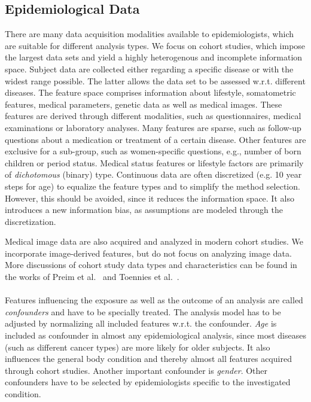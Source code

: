 \documentclass[journal]{style/vgtc} 			          %
\begin{document}
\subsection{Epidemiological Data} \label{sec:EpidemiologicalData}
There are many data acquisition modalities available to epidemiologists, which are suitable for different analysis types.
We focus on cohort studies, which impose the largest data sets and yield a highly heterogenous and incomplete information space.
Subject data are collected either regarding a specific disease or with the widest range possible.
The latter allows the data set to be assessed w.r.t. different diseases.
The feature space comprises information about lifestyle, somatometric features, medical parameters, genetic data as well as medical images.
These features are derived through different modalities, such as questionnaires, medical examinations or laboratory analyses.
Many features are sparse, such as follow-up questions about a medication or treatment of a certain disease.
Other features are exclusive for a sub-group, such as women-specific questions, e.g., number of born children or period status.
Medical status features or lifestyle factors are primarily of \emph{dichotomous} (binary) type.
Continuous data are often discretized (e.g. 10 year steps for age) to equalize the feature types and to simplify the method selection.
However, this should be avoided, since it reduces the information space.
It also introduces a new information bias, as assumptions are modeled through the discretization.

Medical image data are also acquired and analyzed in modern cohort studies.
We incorporate image-derived features, but do not focus on analyzing image data.
More discussions of cohort study data types and characteristics can be found in the works of Preim et al.~\cite{Preim2014} and Toennies et al.~\cite{Toennies2015}.
\\\\
Features influencing the exposure as well as the outcome of an analysis are called \emph{confounders} and have to be specially treated.
The analysis model has to be adjusted by normalizing all included features w.r.t. the confounder.
\emph{Age} is included as confounder in almost any epidemiological analysis, since most diseases (such as different cancer types) are more likely for older subjects.
It also influences the general body condition and thereby almost all features acquired through cohort studies.
Another important confounder is \emph{gender}.
Other confounders have to be selected by epidemiologists specific to the investigated condition.
\end{document}
